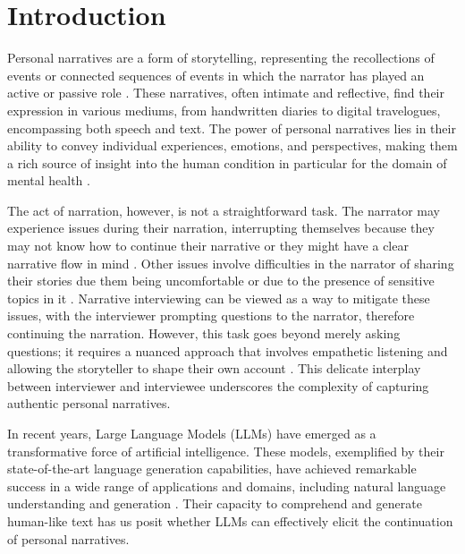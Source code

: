 \chapter{Introduction}
\label{cha:intro}
Personal narratives are a form of storytelling, representing the recollections of events or connected sequences of events in which the narrator has played an active or passive role \cite{tammewarannotation}. These narratives, often intimate and reflective, find their expression in various mediums, from handwritten diaries to digital travelogues, encompassing both speech and text. The power of personal narratives lies in their ability to convey individual experiences, emotions, and perspectives, making them a rich source of insight into the human condition \cite{noauthor-undated-sy, doi:10.1080/1361332032000044567, Bailey2002-fw} in particular for the domain of mental health \cite{Nurser2018-id}. %

The act of narration, however, is not a straightforward task. The narrator may experience issues during their narration, interrupting themselves because they may not know how to continue their narrative or they might have a clear narrative flow in mind \cite{ong2019modeling}. Other issues involve difficulties in the narrator of sharing their stories due them being uncomfortable or due to the presence of sensitive topics in it \cite{Sammantha2021-na}. Narrative interviewing can be viewed as a way to mitigate these issues, with the interviewer prompting questions to the narrator, therefore continuing the narration. However, this task goes beyond merely asking questions; it requires a nuanced approach that involves empathetic listening and allowing the storyteller to shape their own account \cite{Kim2015-es}. This delicate interplay between interviewer and interviewee underscores the complexity of capturing authentic personal narratives.

In recent years, Large Language Models (LLMs) have emerged as a transformative force of artificial intelligence. These models, exemplified by their state-of-the-art language generation capabilities, have achieved remarkable success in a wide range of applications and domains, including natural language understanding and generation \cite{openai2023gpt4, touvronllama, brown2020language}. Their capacity to comprehend and generate human-like text \cite{schramowski2022large} has us posit whether LLMs can effectively elicit the continuation of personal narratives.

